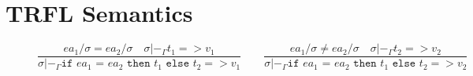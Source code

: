 \documentclass[10pt]{../sigplanconf}
\newcommand{\nfrac}[2]{\frac{\displaystyle{#1}}{\displaystyle{#2}}}
\newcommand{\tagsc}[1]{\tag{\scshape #1}}
\begin{document}



\appendix
\section{TRFL Semantics}
\begin{figure}\centering
  \begin{equation}
    \nfrac{
      ea_1/ \sigma = ea_2/\sigma \quad
      \sigma |-_\Gamma t_1 => v_1
    }{
      \sigma |-_\Gamma \texttt{if $ea_1$ = $ea_2$ then $t_1$ else $t_2$} => v_1
    }
    \qquad
    \nfrac{
      ea_1/ \sigma \neq ea_2/\sigma \quad
      \sigma |-_\Gamma t_2 => v_2
    }{
      \sigma |-_\Gamma \texttt{if $ea_1$ = $ea_2$ then $t_1$ else $t_2$} => v_2
    } \tagsc{If}
\end{equation}


\end{figure}
\end{document}
